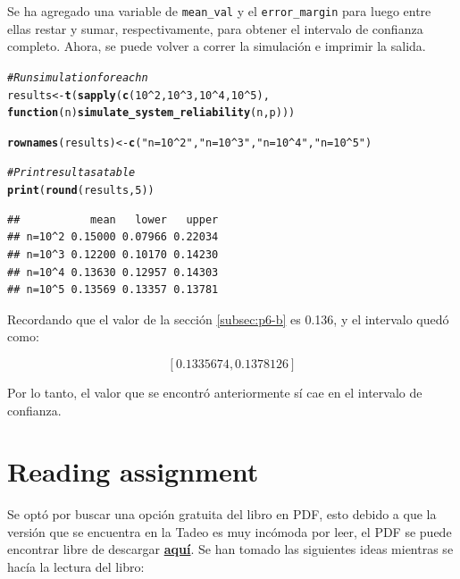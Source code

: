 \documentclass[12pt]{article}\usepackage[]{graphicx}\usepackage[]{xcolor}
\makeatletter
\newcommand{\hlnum}[1]{\textcolor[rgb]{0.686,0.059,0.569}{#1}}%
\newcommand{\hlsng}[1]{\textcolor[rgb]{0.192,0.494,0.8}{#1}}%
\newcommand{\hlcom}[1]{\textcolor[rgb]{0.678,0.584,0.686}{\textit{#1}}}%
\newcommand{\hlopt}[1]{\textcolor[rgb]{0,0,0}{#1}}%
\newcommand{\hldef}[1]{\textcolor[rgb]{0.345,0.345,0.345}{#1}}%
\newcommand{\hlkwa}[1]{\textcolor[rgb]{0.161,0.373,0.58}{\textbf{#1}}}%
\newcommand{\hlkwb}[1]{\textcolor[rgb]{0.69,0.353,0.396}{#1}}%
\newcommand{\hlkwc}[1]{\textcolor[rgb]{0.333,0.667,0.333}{#1}}%
\newcommand{\hlkwd}[1]{\textcolor[rgb]{0.737,0.353,0.396}{\textbf{#1}}}%
\newenvironment{kframe}{%
 \def\at@end@of@kframe{}%
 \ifinner\ifhmode%
  \def\at@end@of@kframe{\end{minipage}}%
  \begin{minipage}{\columnwidth}%
 \fi\fi%
 \def\FrameCommand##1{\hskip\@totalleftmargin \hskip-\fboxsep
 \colorbox{shadecolor}{##1}\hskip-\fboxsep
     \hskip-\linewidth \hskip-\@totalleftmargin \hskip\columnwidth}%
 \MakeFramed {\advance\hsize-\width
   \@totalleftmargin\z@ \linewidth\hsize
   \@setminipage}}%
 {\par\unskip\endMakeFramed%
 \at@end@of@kframe}
\newenvironment{knitrout}{}{} %
\makeatother
\begin{document}
Se ha agregado una variable de \lstinline|mean_val| y el \lstinline|error_margin| para luego entre ellas restar y sumar, respectivamente, para obtener el intervalo de confianza completo. Ahora, se puede volver a correr la simulación e imprimir la salida.


\begin{knitrout}
\color{fgcolor}\begin{kframe}
\begin{alltt}
\hlcom{# Run simulation for each n}
\hldef{results} \hlkwb{<-} \hlkwd{t}\hldef{(}\hlkwd{sapply}\hldef{(}\hlkwd{c}\hldef{(}\hlnum{10}\hlopt{^}\hlnum{2}\hldef{,} \hlnum{10}\hlopt{^}\hlnum{3}\hldef{,} \hlnum{10}\hlopt{^}\hlnum{4}\hldef{,} \hlnum{10}\hlopt{^}\hlnum{5}\hldef{),}
                  \hlkwa{function}\hldef{(}\hlkwc{n}\hldef{)} \hlkwd{simulate_system_reliability}\hldef{(n, p)))}

\hlkwd{rownames}\hldef{(results)} \hlkwb{<-} \hlkwd{c}\hldef{(}\hlsng{"n=10^2"}\hldef{,} \hlsng{"n=10^3"}\hldef{,} \hlsng{"n=10^4"}\hldef{,} \hlsng{"n=10^5"}\hldef{)}

\hlcom{# Print result as a table}
\hlkwd{print}\hldef{(}\hlkwd{round}\hldef{(results,} \hlnum{5}\hldef{))}
\end{alltt}
\begin{verbatim}
##           mean   lower   upper
## n=10^2 0.15000 0.07966 0.22034
## n=10^3 0.12200 0.10170 0.14230
## n=10^4 0.13630 0.12957 0.14303
## n=10^5 0.13569 0.13357 0.13781
\end{verbatim}
\end{kframe}
\end{knitrout}

Recordando que el valor de la sección \ref{subsec:p6-b} es 0.136, y el intervalo quedó como:
 
\[
[0.1335674, 0.1378126 ]
\]

Por lo tanto, el valor que se encontró anteriormente sí cae en el intervalo de confianza.


\section{Reading assignment}

Se optó por buscar una opción gratuita del libro en PDF, esto debido a que la versión que se encuentra en la Tadeo es muy incómoda por leer, el PDF se puede encontrar libre de descargar \href{https://www.academia.edu/114463674/Practical_Statistics_for_Data_Scientists_50_Essential_Concepts_Using_R_and_Python_by_Peter_Bruce_Andrew_Bruce_Peter_Gedeck}{\textbf{aquí}}. Se han tomado las siguientes ideas mientras se hacía la lectura del libro:
\end{document}
